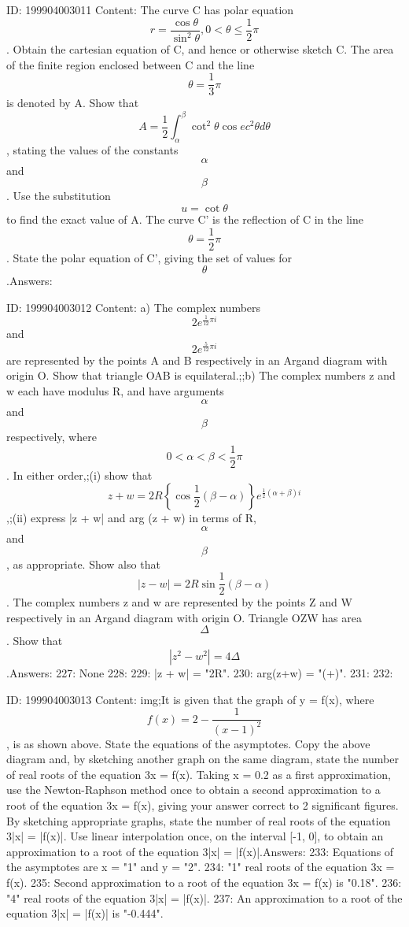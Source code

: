 \documentclass{article}
\begin{document}
ID: 199904003011
Content:
The curve C has polar equation \[r = \frac {\cos \theta}{\sin^2 \theta}, 0 < \theta \leq \frac {1}{2}\pi\]. Obtain the cartesian equation of C, and hence or otherwise sketch C. The area of the finite region enclosed between C and the line \[\theta = \frac {1}{3}\pi\] is denoted by A. Show that \[A = \frac{1}{2}\int_{\alpha}^{\beta} \cot^2 \theta \cos ec^2 \theta d \theta\], stating the values of the constants \[\alpha\] and \[\beta\]. Use the substitution \[u = \cot \theta\] to find the exact value of A. The curve C' is the reflection of C in the line \[\theta = \frac {1}{2} \pi\]. State the polar equation of C', giving the set of values for \[\theta\].Answers:

ID: 199904003012
Content:
a) The complex numbers \[2e^{\frac {1}{12} \pi i}\] and \[2e^{\frac {5}{12} \pi i}\] are represented by the points A and B respectively in an Argand diagram with origin O. Show that triangle OAB is equilateral.;;b) The complex numbers z and w each have modulus R, and have arguments \[\alpha\] and \[\beta\] respectively, where \[0 < \alpha < \beta < \frac {1}{2} \pi\]. In either order,;(i) show that \[z + w = 2R \left \{ \cos \frac {1}{2} (\beta - \alpha) \right \}e^{\frac {1}{2}(\alpha + \beta)i}\],;(ii) express |z + w| and arg (z + w) in terms of R, \[\alpha\] and \[\beta\], as appropriate. Show also that \[|z - w| = 2R\sin \frac {1}{2}(\beta - \alpha)\]. The complex numbers z and w are represented by the points Z and W respectively in an Argand diagram with origin O. Triangle OZW has area \[\Delta\]. Show that \[|z^2 - w^2| = 4\Delta \].Answers:
227: None
228: 
229: |z + w| = "2R".
230: arg(z+w) = "(\alpha+\beta)".
231: 
232: 

ID: 199904003013
Content:
img;It is given that the graph of y = f(x), where \[f(x) = 2 - \frac {1}{(x-1)^2}\], is as shown above. State the equations of the asymptotes. Copy the above diagram and, by sketching another graph on the same diagram, state the number of real roots of the equation 3x = f(x). Taking x = 0.2 as a first approximation, use the Newton-Raphson method once to obtain a second approximation to a root of the equation 3x = f(x), giving your answer correct to 2 significant figures. By sketching appropriate graphs, state the number of real roots of the equation 3|x| = |f(x)|. Use linear interpolation once, on the interval [-1, 0], to obtain an approximation to a root of the equation 3|x| = |f(x)|.Answers:
233: Equations of the asymptotes are x = "1" and y = "2".
234: "1" real roots of the equation 3x = f(x).
235: Second approximation to a root of the equation 3x = f(x) is "0.18".
236: "4" real roots of the equation 3|x| = |f(x)|.
237: An approximation to a root of the equation 3|x| = |f(x)| is "-0.444".
\end{document}

